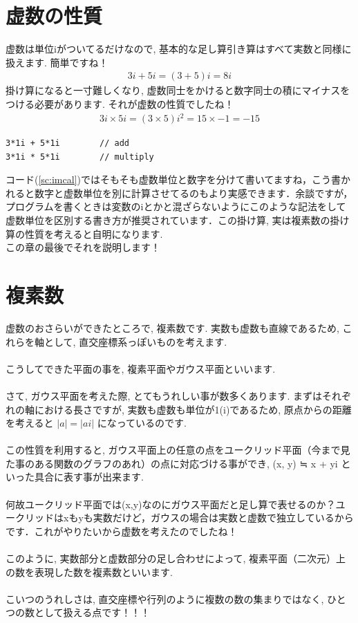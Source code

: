\documentclass[11pt,a4paper]{jreport}
\begin{document}
\section{虚数の性質}
虚数は単位iがついてるだけなので, 基本的な足し算引き算はすべて実数と同様に扱えます. 簡単ですね！\\
\begin{eqnarray}
\label{eq:implus}
3i + 5i  =(3 + 5)i = 8i
\end{eqnarray}
掛け算になると一寸難しくなり, 虚数同士をかけると数字同士の積にマイナスをつける必要があります. それが虚数の性質でしたね！\\
\begin{eqnarray}
\label{eq:imkake}
3i ×5i = (3×5)i^2 = 15 ×-1 = -15
\end{eqnarray}


\begin{lstlisting}[caption=式(\ref{eq:implus} \ref{eq:imkake})あたりのコード,label=sc:imcal , keepspaces=true]
3*1i + 5*1i        // add
3*1i * 5*1i        // multiply
\end{lstlisting}

コード(\ref{sc:imcal})ではそもそも虚数単位と数字を分けて書いてますね，こう書かれると数字と虚数単位を別に計算させてるのもより実感できます．余談ですが，プログラムを書くときは変数のiとかと混ざらないようにこのような記法をして虚数単位を区別する書き方が推奨されています．この掛け算, 実は複素数の掛け算の性質を考えると自明になります.\\
この章の最後でそれを説明します！\\
\section{複素数}
虚数のおさらいができたところで, 複素数です. 実数も虚数も直線であるため, これらを軸として, 直交座標系っぽいものを考えます.\\
\\
こうしてできた平面の事を, 複素平面やガウス平面といいます.\\
\\
さて, ガウス平面を考えた際, とてもうれしい事が数多くあります. まずはそれぞれの軸における長さですが, 実数も虚数も単位が1(i)であるため, 原点からの距離を考えると $ |a| = |ai| $ になっているのです. \\
\\
この性質を利用すると, ガウス平面上の任意の点をユークリッド平面（今まで見た事のある関数のグラフのあれ）の点に対応づける事ができ, (x, y) ≒ x + yi といった具合に表す事が出来ます. \\
\\
何故ユークリッド平面では(x,y)なのにガウス平面だと足し算で表せるのか？ユークリッドはxもyも実数だけど，ガウスの場合は実数と虚数で独立しているからです．これがやりたいから虚数を考えたのでしたね！\\
\\
このように, 実数部分と虚数部分の足し合わせによって, 複素平面（二次元）上の数を表現した数を複素数といいます.\\
\\
こいつのうれしさは, 直交座標や行列のように複数の数の集まりではなく, ひとつの数として扱える点です！！！\\
\end{document}
